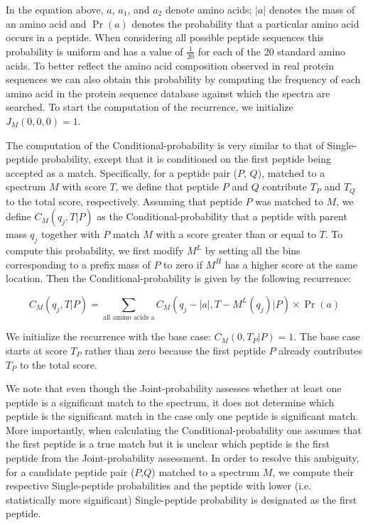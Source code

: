 \documentclass[arial,11pt]{article}
\begin{document}
In the equation above, $a$, $a_1$, and $a_2$ denote amino acids; $|a|$ denotes the mass of an amino acid and $\Pr(a)$ denotes the probability that a particular amino acid occurs in a peptide.  When considering all possible peptide sequences this probability is uniform and has a value of $\frac{1}{20}$ for each of the 20 standard amino acids. To better reflect the amino acid composition observed in real protein sequences we can also obtain this probability by computing the frequency of each amino acid in the protein sequence database against which the spectra are searched.  To start the computation of the recurrence, we initialize $J_M(0,0,0)=1$.

The computation of the Conditional-probability is very similar to that of Single-peptide probability, except that it is conditioned on the first peptide being accepted as a match. %
Specifically, for a peptide pair ($P$, $Q$),  matched to a spectrum $M$ with score $T$, we define that peptide $P$ and $Q$ contribute $T_{P}$ and $T_{Q}$ to the total score, respectively. Assuming that peptide $P$ was matched to $M$, we define $C_M(q_{j}, T | P)$ as the Conditional-probability that a peptide with parent mass $q_{j}$ together with $P$ match $M$ with a score greater than or equal to $T$. To compute this probability, we first modify $M^{L}$ by setting all the bins corresponding to a prefix mass of $P$ to zero if $M^{H}$ has a higher score at the same location.
Then the Conditional-probability is given by the following recurrence:

\begin{equation*}
C_M(q_{j},T | P) = \sum\limits_{\text{all\ amino\ acids\ a}}{C_M(q_{j} - |a|, T - M^{L}(q_{j}) | P)}\times \Pr(a)
\end{equation*}

We initialize the recurrence with the base case: $C_M(0, T_{P} | P) = 1$.  The base case starts at score $T_{P}$ rather than zero because the first peptide $P$ already contributes $T_{P}$ to the total score.

We note that even though the Joint-probability assesses whether at least one peptide is a significant match to the spectrum, it does not determine which peptide is the significant match in the case only one peptide is significant match.  More importantly, when calculating the Conditional-probability one assumes that the first peptide is a true match but it is unclear which peptide is the first peptide from the Joint-probability assessment. In order to resolve this ambiguity, for a candidate peptide pair ($P$,$Q$) matched to a spectrum $M$, we compute their respective Single-peptide probabilities and the peptide with lower (i.e. statistically more significant) Single-peptide probability is designated as the first peptide.
\end{document}
